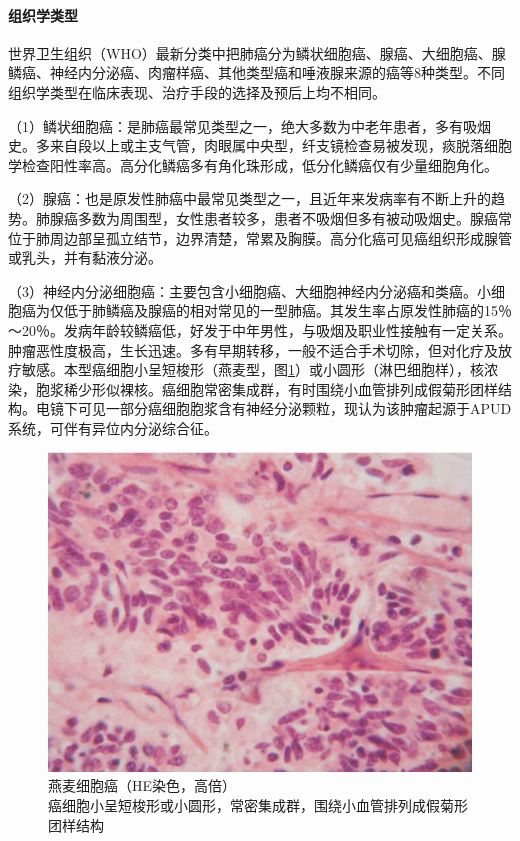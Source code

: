 \paragraph{组织学类型}
世界卫生组织（WHO）最新分类中把肺癌分为鳞状细胞癌、腺癌、大细胞癌、腺鳞癌、神经内分泌癌、肉瘤样癌、其他类型癌和唾液腺来源的癌等8种类型。不同组织学类型在临床表现、治疗手段的选择及预后上均不相同。

（1）鳞状细胞癌：是肺癌最常见类型之一，绝大多数为中老年患者，多有吸烟史。多来自段以上或主支气管，肉眼属中央型，纤支镜检查易被发现，痰脱落细胞学检查阳性率高。高分化鳞癌多有角化珠形成，低分化鳞癌仅有少量细胞角化。

（2）腺癌：也是原发性肺癌中最常见类型之一，且近年来发病率有不断上升的趋势。肺腺癌多数为周围型，女性患者较多，患者不吸烟但多有被动吸烟史。腺癌常位于肺周边部呈孤立结节，边界清楚，常累及胸膜。高分化癌可见癌组织形成腺管或乳头，并有黏液分泌。

（3）神经内分泌细胞癌：主要包含小细胞癌、大细胞神经内分泌癌和类癌。小细胞癌为仅低于肺鳞癌及腺癌的相对常见的一型肺癌。其发生率占原发性肺癌的15％～20％。发病年龄较鳞癌低，好发于中年男性，与吸烟及职业性接触有一定关系。肿瘤恶性度极高，生长迅速。多有早期转移，一般不适合手术切除，但对化疗及放疗敏感。本型癌细胞小呈短梭形（燕麦型，图\ref{fig7-16}）或小圆形（淋巴细胞样），核浓染，胞浆稀少形似裸核。癌细胞常密集成群，有时围绕小血管排列成假菊形团样结构。电镜下可见一部分癌细胞胞浆含有神经分泌颗粒，现认为该肿瘤起源于APUD系统，可伴有异位内分泌综合征。

\begin{figure}[!htbp]
 \centering
 \includegraphics{./images/Image00125.jpg}
 \captionsetup{justification=centering}
 \caption{燕麦细胞癌（HE染色，高倍）\\ {\small 癌细胞小呈短梭形或小圆形，常密集成群，围绕小血管排列成假菊形团样结构}}
\label{fig7-16}
  \end{figure}

